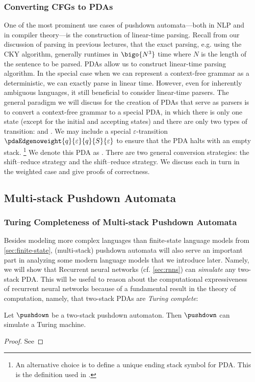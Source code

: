 \subsubsection{Converting CFGs to PDAs} \label{sec:cfg2pda}
One of the most prominent use cases of pushdown automata---both in NLP and in compiler theory---is the construction of linear-time parsing.
Recall from our discussion of parsing in previous lectures, that the exact parsing, e.g. using the CKY algorithm, generally runtimes in $\bigo{N^3}$ time where $N$ is the length of the sentence to be parsed.
PDAs allow us to construct linear-time parsing algorithm.
In the special case when we can represent a context-free grammar as a deterministic, we can exactly parse in linear time.
However, even for inherently ambiguous languages, it still beneficial to consider linear-time parsers.
The general paradigm we will discuss for the creation of PDAs that serve as parsers is to convert a context-free grammar to a special PDA, in which there is only one state (except for the initial and accepting states) and there are only two types of transition: \shift{} and \reduce{}. We may include a special $\varepsilon$-transition $\pdaEdgenoweight{q}{\varepsilon}{q}{S}{\varepsilon}$ to ensure that the PDA halts with an empty stack. \footnote{An alternative choice is to define a unique ending stack symbol for PDA. This is the definition used in \rayuela{}.} We denote this PDA as .
There are two general conversion strategies: the  shift--reduce strategy and the  shift--reduce strategy.
We discuss each in turn in the weighted case and give proofs of correctness.

\subsection{Multi-stack Pushdown Automata}


\subsubsection{Turing Completeness of Multi-stack Pushdown Automata}

Besides modeling more complex languages than finite-state language models from \cref{sec:finite-state}, (multi-stack) pushdown automata will also serve an important part in analyzing some modern language models that we introduce later.
Namely, we will show that Recurrent neural networks (cf. \cref{sec:rnns}) can \emph{simulate} any two-stack PDA.
This will be useful to reason about the computational expressiveness of recurrent neural networks because of a fundamental result in the theory of computation, namely, that two-stack PDAs are \emph{Turing complete}:
\begin{theorem}
    Let $\pushdown$ be a two-stack pushdown automaton. Then $\pushdown$ can simulate a Turing machine.
\end{theorem}
\begin{proof}
    See 
\end{proof}